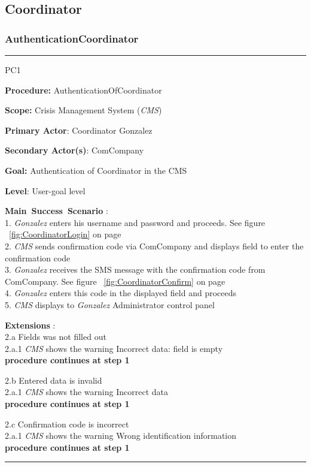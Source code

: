 \subsection{Coordinator}

\subsubsection{AuthenticationCoordinator}

\vspace{0.5cm}
\hrule
\begin{lyxlist}{PC1}
\small{
\item [\textbf{Procedure:}] AuthenticationOfCoordinator
\item [\textbf{Scope:}] Crisis Management System (\emph{CMS})
\item [\textbf{Primary Actor}:] Coordinator Gonzalez
\item [\textbf{Secondary Actor(s)}:] ComCompany
\item [\textbf{Goal:}] Authentication of Coordinator in the CMS
\item [\textbf{Level}:] User-goal level
\item [\textbf{Main~Success~Scenario}]:\\
1. \emph{Gonzalez} enters his username and password and proceeds. See figure
~\ref{fig:CoordinatorLogin} on page~\pageref{fig:CoordinatorLogin}\\
2. \emph{CMS} sends confirmation code via ComCompany and displays field to enter
the confirmation code\\
3. \emph{Gonzalez} receives the SMS message with the confirmation code from
ComCompany. See figure ~\ref{fig:CoordinatorConfirm} on
page ~\pageref{fig:CoordinatorConfirm}\\
4. \emph{Gonzalez} enters this code in the displayed field and
proceeds\\
5. \emph{CMS} displays to \emph{Gonzalez} Administrator control panel

\item [\textbf{Extensions}]:\\
2.a Fields was not filled out\\
\hspace*{0.5cm} 2.a.1 \emph{CMS} shows the warning Incorrect data: field is
empty\\
\hspace*{0.5cm} \textbf{procedure continues at step 1}

2.b Entered data is invalid\\
\hspace*{0.5cm} 2.a.1 \emph{CMS} shows the warning Incorrect data\\
\hspace*{0.5cm} \textbf{procedure continues at step 1}

2.c Confirmation code is incorrect\\
\hspace*{0.5cm} 2.a.1 \emph{CMS} shows the warning Wrong identification information\\
\hspace*{0.5cm} \textbf{procedure continues at step 1}

}
\end{lyxlist}
\hrule
\vspace{0.5cm}


